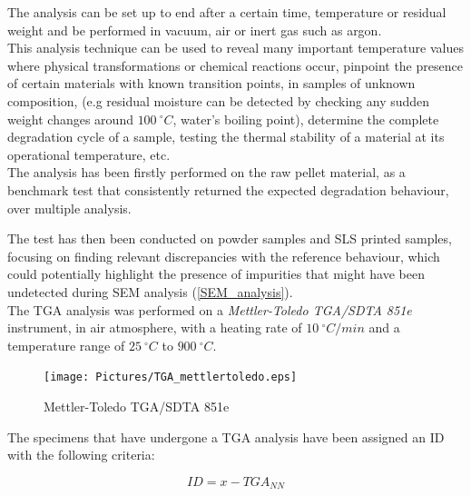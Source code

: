 \documentclass{article}
\begin{document}
            The analysis can be set up to end after a certain time, temperature or residual weight and be performed 
            in vacuum, air or inert gas such as argon. \\

        This analysis technique can be used to reveal many important temperature values where physical transformations or chemical 
        reactions occur, pinpoint the presence of certain materials with known transition points, in samples of unknown composition, 
        (e.g residual moisture can be detected by checking any sudden weight changes around $100 \ ^{\circ}C $, water's boiling point), 
        determine the complete degradation cycle of a sample, testing the thermal stability of a material at its operational temperature, etc. \\ 

        The analysis has been firstly performed on the raw pellet material, as a benchmark test
        that consistently returned the expected degradation behaviour, over multiple analysis. 

            The test has then been conducted on powder samples and SLS printed samples, focusing on finding relevant 
            discrepancies with the reference behaviour, which could potentially highlight the presence of impurities
            that might have been undetected during SEM analysis (\ref{SEM_analysis}). \\ 

            The TGA analysis was performed on a \textit{Mettler-Toledo TGA/SDTA 851e} \autocites{Mettler_Toledo} instrument, 
            in air atmosphere, with a heating rate of $10 \ ^{\circ}C/min$ and a temperature range of $25 \ ^{\circ}C$ to $900 \ ^{\circ}C$. \\

            \begin{figure}[h!]
                \centering
                \texttt{[image: Pictures/TGA\_mettlertoledo.eps]}
                \caption{Mettler-Toledo TGA/SDTA 851e \autocites{Mettler_Toledo}}
                \label{fig:TGA_mettlertoledo}
            \end{figure}

            The specimens that have undergone a TGA analysis have been assigned an ID with the following criteria:

                \begin{equation}
                    ID = x-TGA_{NN}
                    \label{eq:TGA_ID}
                \end{equation}
\end{document}

